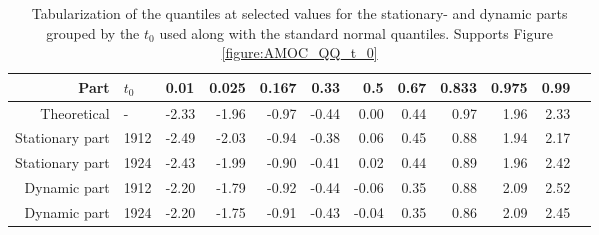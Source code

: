     \begin{table}[h!]
        \centering
        \begin{tabular}{rllrrrrrrrrr}
          \hline
         Part & $t_0$ & 0.01 & 0.025 & 0.167 & 0.33 & 0.5 & 0.67 & 0.833 & 0.975 & 0.99 \\ 
          \hline
        Theoretical & - & -2.33 & -1.96 & -0.97 & -0.44 & 0.00 & 0.44 & 0.97 & 1.96 & 2.33 \\ 
        Stationary part & 1912 & -2.49 & -2.03 & -0.94 & -0.38 & 0.06 & 0.45 & 0.88 & 1.94 & 2.17 \\ 
        Stationary part & 1924 & -2.43 & -1.99 & -0.90 & -0.41 & 0.02 & 0.44 & 0.89 & 1.96 & 2.42 \\ 
        Dynamic part & 1912 & -2.20 & -1.79 & -0.92 & -0.44 & -0.06 & 0.35 & 0.88 & 2.09 & 2.52 \\ 
        Dynamic part & 1924 & -2.20 & -1.75 & -0.91 & -0.43 & -0.04 & 0.35 & 0.86 & 2.09 & 2.45 \\ 
           \hline
        \end{tabular}
        \caption{Tabularization of the quantiles at selected values for the stationary- and dynamic parts grouped by the $t_0$ used along with the standard normal quantiles. Supports Figure \ref{figure:AMOC_QQ_t_0}}
        \label{table:QQ_table_parts}
        \end{table}
    
